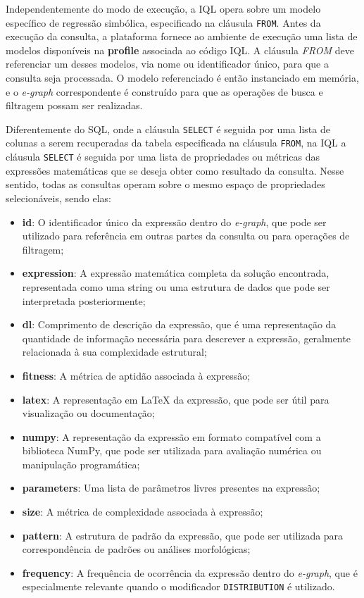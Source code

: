 Independentemente do modo de execução, a IQL opera sobre um modelo específico de regressão simbólica, especificado na cláusula \texttt{FROM}. Antes da execução da consulta, a plataforma fornece ao ambiente de execução uma lista de modelos disponíveis na \textbf{profile} associada ao código IQL. A cláusula \textit{FROM} deve referenciar um desses modelos, via nome ou identificador único, para que a consulta seja processada. O modelo referenciado é então instanciado em memória, e o \textit{e-graph} correspondente é construído para que as operações de busca e filtragem possam ser realizadas.

Diferentemente do SQL, onde a cláusula \texttt{SELECT} é seguida por uma lista de colunas a serem recuperadas da tabela especificada na cláusula \texttt{FROM}, na IQL a cláusula \texttt{SELECT} é seguida por uma lista de propriedades ou métricas das expressões matemáticas que se deseja obter como resultado da consulta. Nesse sentido, todas as consultas operam sobre o mesmo espaço de propriedades selecionáveis, sendo elas:
\begin{itemize}
    \item \textbf{id}: O identificador único da expressão dentro do \textit{e-graph}, que pode ser utilizado para referência em outras partes da consulta ou para operações de filtragem;
    \item \textbf{expression}: A expressão matemática completa da solução encontrada, representada como uma string ou uma estrutura de dados que pode ser interpretada posteriormente;
    \item \textbf{dl}: Comprimento de descrição da expressão, que é uma representação da quantidade de informação necessária para descrever a expressão, geralmente relacionada à sua complexidade estrutural;
    \item \textbf{fitness}: A métrica de aptidão associada à expressão;
    \item \textbf{latex}: A representação em LaTeX da expressão, que pode ser útil para visualização ou documentação;
    \item \textbf{numpy}: A representação da expressão em formato compatível com a biblioteca NumPy, que pode ser utilizada para avaliação numérica ou manipulação programática;
    \item \textbf{parameters}: Uma lista de parâmetros livres presentes na expressão;
    \item \textbf{size}: A métrica de complexidade associada à expressão;
    \item \textbf{pattern}: A estrutura de padrão da expressão, que pode ser utilizada para correspondência de padrões ou análises morfológicas;
    \item \textbf{frequency}: A frequência de ocorrência da expressão dentro do \textit{e-graph}, que é especialmente relevante quando o modificador \texttt{DISTRIBUTION} é utilizado.
\end{itemize}

